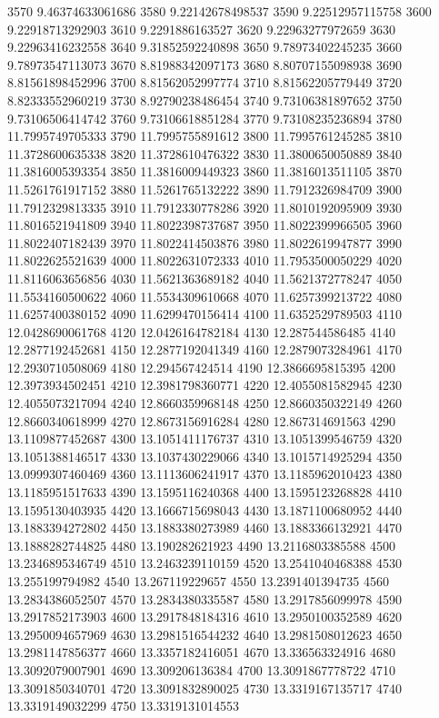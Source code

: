 {3570 9.46374633061686
3580 9.22142678498537
3590 9.22512957115758
3600 9.22918713292903
3610 9.2291886163527
3620 9.22963277972659
3630 9.22963416232558
3640 9.31852592240898
3650 9.78973402245235
3660 9.78973547113073
3670 8.81988342097173
3680 8.80707155098938
3690 8.81561898452996
3700 8.81562052997774
3710 8.81562205779449
3720 8.82333552960219
3730 8.92790238486454
3740 9.73106381897652
3750 9.73106506414742
3760 9.73106618851284
3770 9.73108235236894
3780 11.7995749705333
3790 11.7995755891612
3800 11.7995761245285
3810 11.3728600635338
3820 11.3728610476322
3830 11.3800650050889
3840 11.3816005393354
3850 11.3816009449323
3860 11.3816013511105
3870 11.5261761917152
3880 11.5261765132222
3890 11.7912326984709
3900 11.7912329813335
3910 11.7912330778286
3920 11.8010192095909
3930 11.8016521941809
3940 11.8022398737687
3950 11.8022399966505
3960 11.8022407182439
3970 11.8022414503876
3980 11.8022619947877
3990 11.8022625521639
4000 11.8022631072333
4010 11.7953500050229
4020 11.8116063656856
4030 11.5621363689182
4040 11.5621372778247
4050 11.5534160500622
4060 11.5534309610668
4070 11.6257399213722
4080 11.6257400380152
4090 11.6299470156414
4100 11.6352529789503
4110 12.0428690061768
4120 12.0426164782184
4130 12.287544586485
4140 12.2877192452681
4150 12.2877192041349
4160 12.2879073284961
4170 12.2930710508069
4180 12.294567424514
4190 12.3866695815395
4200 12.3973934502451
4210 12.3981798360771
4220 12.4055081582945
4230 12.4055073217094
4240 12.8660359968148
4250 12.8660350322149
4260 12.8660340618999
4270 12.8673156916284
4280 12.867314691563
4290 13.1109877452687
4300 13.1051411176737
4310 13.1051399546759
4320 13.1051388146517
4330 13.1037430229066
4340 13.1015714925294
4350 13.0999307460469
4360 13.1113606241917
4370 13.1185962010423
4380 13.1185951517633
4390 13.1595116240368
4400 13.1595123268828
4410 13.1595130403935
4420 13.1666715698043
4430 13.1871100680952
4440 13.1883394272802
4450 13.1883380273989
4460 13.1883366132921
4470 13.1888282744825
4480 13.190282621923
4490 13.2116803385588
4500 13.2346895346749
4510 13.2463239110159
4520 13.2541040468388
4530 13.255199794982
4540 13.267119229657
4550 13.2391401394735
4560 13.2834386052507
4570 13.2834380335587
4580 13.2917856099978
4590 13.2917852173903
4600 13.2917848184316
4610 13.2950100352589
4620 13.2950094657969
4630 13.2981516544232
4640 13.2981508012623
4650 13.2981147856377
4660 13.3357182416051
4670 13.336563324916
4680 13.3092079007901
4690 13.309206136384
4700 13.3091867778722
4710 13.3091850340701
4720 13.3091832890025
4730 13.3319167135717
4740 13.3319149032299
4750 13.3319131014553
}
